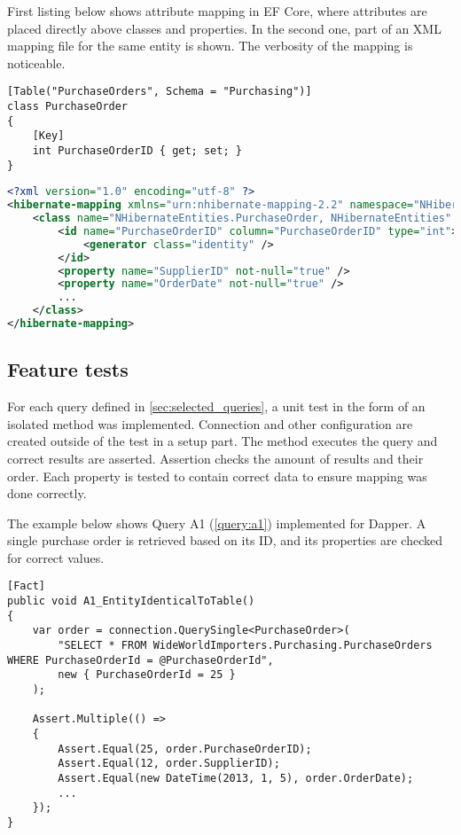 First listing below shows attribute mapping in EF Core, where attributes are placed directly above classes and properties. In the second one, part of an XML mapping file for the same entity is shown. The verbosity of the mapping is noticeable.

\begin{lstlisting}[language=CSharp,basicstyle=\ttfamily\footnotesize]
[Table("PurchaseOrders", Schema = "Purchasing")]
class PurchaseOrder
{
    [Key]
    int PurchaseOrderID { get; set; }
}
\end{lstlisting}

\begin{lstlisting}[language=xml,basicstyle=\ttfamily\footnotesize]
<?xml version="1.0" encoding="utf-8" ?>
<hibernate-mapping xmlns="urn:nhibernate-mapping-2.2" namespace="NHibernateEntities">
    <class name="NHibernateEntities.PurchaseOrder, NHibernateEntities" table="PurchaseOrders" schema="Purchasing">
        <id name="PurchaseOrderID" column="PurchaseOrderID" type="int">
            <generator class="identity" />
        </id>
        <property name="SupplierID" not-null="true" />
        <property name="OrderDate" not-null="true" />
        ...
    </class>
</hibernate-mapping>
\end{lstlisting}

\subsection{Feature tests}

For each query defined in \autoref{sec:selected_queries}, a unit test in the form of an isolated method was implemented. Connection and other configuration are created outside of the test in a setup part. The method executes the query and correct results are asserted. Assertion checks the amount of results and their order. Each property is tested to contain correct data to ensure mapping was done correctly.

The example below shows Query A1 (\autoref{query:a1}) implemented for Dapper. A single purchase order is retrieved based on its ID, and its properties are checked for correct values. 
\begin{lstlisting}[language=CSharp]
[Fact]
public void A1_EntityIdenticalToTable()
{
    var order = connection.QuerySingle<PurchaseOrder>(
        "SELECT * FROM WideWorldImporters.Purchasing.PurchaseOrders WHERE PurchaseOrderId = @PurchaseOrderId",
        new { PurchaseOrderId = 25 }
    );

    Assert.Multiple(() =>
    {
        Assert.Equal(25, order.PurchaseOrderID);
        Assert.Equal(12, order.SupplierID);
        Assert.Equal(new DateTime(2013, 1, 5), order.OrderDate);
        ...
    });
}
\end{lstlisting}

